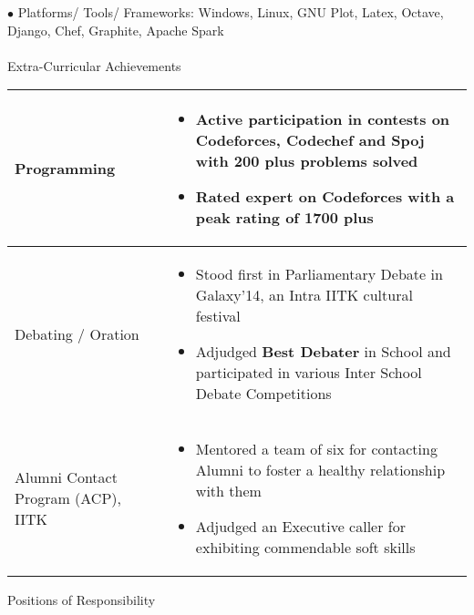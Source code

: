 \documentclass{article}
\begin{document}
$\bullet$ Platforms/ Tools/ Frameworks: Windows, Linux, GNU Plot, Latex, Octave, Django, Chef, Graphite, Apache Spark\\\\
{\Large Extra-Curricular Achievements}
\newline
\newline
\begin{tabular}{| P{3cm} |  P{15.4cm}|}
\hline
\vspace{0.3cm}Programming & \vspace{-0.4cm}\begin{itemize}[leftmargin=0.3cm]
\setlength\itemsep{0.2pt}
\item Active participation in contests on Codeforces, Codechef and Spoj with \textbf{200 plus} problems solved
\item Rated expert on Codeforces with a peak rating of \textbf{1700 plus}
\end{itemize}\\
\hline
\vspace{0.3cm}Debating / Oration & \vspace{-0.4cm}\begin{itemize}[leftmargin=0.3cm]
\setlength\itemsep{0.2pt}
\item Stood first in Parliamentary Debate in Galaxy'14, an Intra IITK cultural festival 
\item Adjudged \textbf{Best Debater} in School and participated in various Inter School Debate Competitions
\end{itemize}\\
\hline
\vspace{0cm}Alumni Contact Program (ACP), IITK & \vspace{-0.4cm}\begin{itemize}[leftmargin=0.3cm]
\setlength\itemsep{0.2pt}
\item Mentored a team of six for contacting Alumni to foster a healthy relationship with them
\item Adjudged an Executive caller for exhibiting commendable soft skills\end{itemize}\\
\hline
\end{tabular}\vspace{0.2cm}
{\Large Positions of Responsibility}
\newline
\newline
\end{document}
